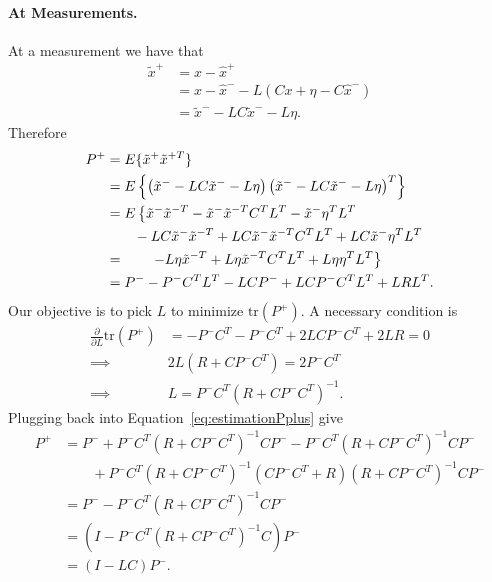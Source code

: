 {\paragraph{At Measurements.}
At a measurement we have that
\begin{align*}
\tilde{x}^{+} &= x-\hat{x}^{+} \\
&= x-\hat{x}^{-} - L\left(Cx + \eta - C\hat{x}^{-}\right) \\
&= \tilde{x}^{-} - LC\tilde{x}^{-} - L\eta.
\end{align*}
Therefore
\begin{align}
P^{+} &= E\{ \tilde{x}^{+}\tilde{x}^{+T} \} \notag \\
&= E\left\{ \left( \tilde{x}^{-} - LC\tilde{x}^{-} - L\eta \right)
\left( \tilde{x}^{-} - LC\tilde{x}^{-} - L\eta \right)^T \right\} \notag \\
&= E\left\{ \tilde{x}^{-}\tilde{x}^{-T} -
\tilde{x}^{-}\tilde{x}^{-T} C^T L^T - \tilde{x}^{-} \eta^T L^T
\right. \notag \\
&\qquad -LC\tilde{x}^{-}\tilde{x}^{-T} + LC
\tilde{x}^{-}\tilde{x}^{-T} C^T L^T + LC\tilde{x}^{-}\eta^TL^T \notag \\
&=\qquad \left. -L\eta\tilde{x}^{-T} + L\eta\tilde{x}^{-T}C^TL^T +
L\eta\eta^TL^T \right\} \notag \\
&= P^{-} - P^{-}C^TL^T - LCP^{-} + LCP^{-}C^TL^T + LRL^T.
\label{eq:estimationPplus}
\end{align}
Our objective is to pick $L$ to minimize $\text{tr}(P^{+})$.  A
necessary condition is
\begin{align*}
\frac{\partial}{\partial L} \text{tr}(P^{+}) &= -P^{-}C^T - P^{-}C^T
+ 2LCP^{-}C^T + 2LR = 0 \\
\implies & 2L(R+CP^{-}C^T)=2P^{-}C^T \\
\implies & L = P^{-}C^T(R+CP^{-}C^T)^{-1}.
\end{align*}
Plugging back into Equation~\eqref{eq:estimationPplus} give
\begin{align*}
P^{+} &= P^{-} + P^{-}C^T(R+CP^{-}C^T)^{-1}CP^{-} -
P^{-}C^T(R+CP^{-}C^T)^{-1}CP^{-} \\
&\qquad +
P^{-}C^T(R+CP^{-}C^T)^{-1}(CP^{-}C^T+R)(R+CP^{-}C^T)^{-1}CP^{-} \\
&= P^{-} - P^{-}C^T(R+CP^{-}C^T)^{-1}CP^{-} \\
&= (I-P^{-}C^T(R+CP^{-}C^T)^{-1}C)P^{-} \\
&= (I-LC)P^{-}.
\end{align*}

}
